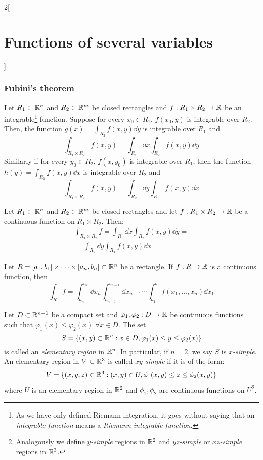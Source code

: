 \documentclass[../../../main_math.tex]{subfiles}
\begin{document}
\begin{multicols}{2}[\section{Functions of several variables}]
  \subsubsection{Fubini's theorem}
  \begin{theorem}\label{FSV:fubini}
    Let $R_1\subset\mathbb{R}^n$ and $R_2\subset\mathbb{R}^m$ be closed rectangles and $f:R_1\times R_2\rightarrow\mathbb{R} $ be an integrable\footnote{As we have only defined Riemann-integration, it goes without saying that an \emph{integrable function} means a \emph{Riemann-integrable function}.} function. Suppose for every $x_0\in R_1$, $f(x_0,y)$ is integrable over $R_2$. Then, the function $\displaystyle g(x)=\int_{R_2}f(x,y)\dd{y}$ is integrable over $R_1$ and $$\int_{R_1\times R_2}f(x,y)=\int_{R_1}\dd{x}\int_{R_2}f(x,y)\dd{y}$$ Similarly if for every $y_0\in R_2$, $f(x,y_0)$ is integrable over $R_1$, then the function $\displaystyle h(y)=\int_{R_1}f(x,y)\dd{x}$ is integrable over $R_2$ and $$\int_{R_1\times R_2}f(x,y)=\int_{R_2}\dd{y}\int_{R_1}f(x,y)\dd{x}$$
    \begin{corollary}
      Let $R_1\subset\mathbb{R}^n$ and $R_2\subset\mathbb{R}^m$ be closed rectangles and let $f:R_1\times R_2\rightarrow\mathbb{R} $ be a continuous function on $R_1\times R_2$. Then: \begin{multline*}
        \int_{R_1\times R_2}f=\int_{R_1}\dd{x}\int_{R_2}f(x,y)\dd{y}=\\=\int_{R_2}\dd{y}\int_{R_1}f(x,y)\dd{x}
      \end{multline*}
    \end{corollary}
    \begin{corollary}
      Let $R=[a_1,b_1]\times\cdots\times[a_n,b_n]\subset\mathbb{R}^n$ be a rectangle. If $f:R\rightarrow\mathbb{R} $ is a continuous function, then $$\int_Rf=\int_{a_n}^{b_n}\dd{x_n}\int_{a_{n-1}}^{b_{n-1}}\dd{x_{n-1}}\cdots\int_{a_1}^{b_1}f(x_1,\ldots,x_n)\dd{x_1}$$
    \end{corollary}
    \begin{definition}
      Let $D\subset\mathbb{R}^{n-1}$ be a compact set and $\varphi_1,\varphi_2:D\rightarrow\mathbb{R} $ be continuous functions such that $\varphi_1(x)\leq\varphi_2(x)$ $\forall x\in D$. The set $$S=\{(x,y)\subset\mathbb{R}^n:x\in D, \varphi_1(x)\leq y\leq\varphi_2(x)\}$$ is called an \emph{elementary region} in $\mathbb{R}^n$. In particular, if $n=2$, we say $S$ is \emph{$x$-simple}. An elementary region in $V\subset\mathbb{R}^3$ is called \emph{$xy$-simple} if it is of the form: $$V=\{(x,y,z)\in\mathbb{R}^3:(x,y)\in U, \phi_1(x,y)\leq z\leq\phi_2(x,y)\}$$ where $U$ is an elementary region in $\mathbb{R}^2$ and $\phi_1,\phi_2$ are continuous functions on $U$\footnote{Analogously we define \emph{$y$-simple} regions in $\mathbb{R}^2$ and \emph{$yz$-simple} or \emph{$xz$-simple} regions in $\mathbb{R}^3$.}.

\end{definition}
\end{theorem}
\end{multicols}
\end{document}
